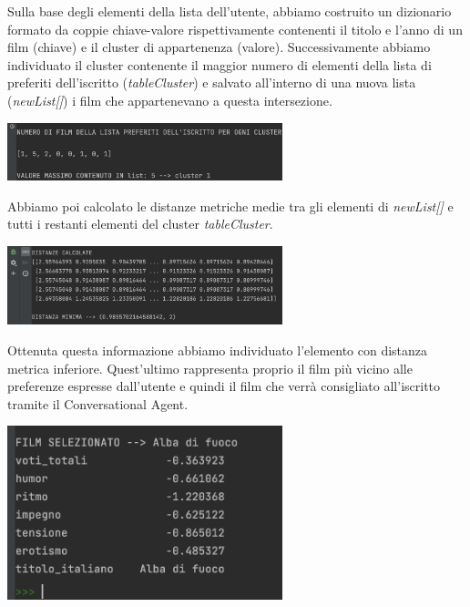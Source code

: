 \documentclass[a4paper, 10pt]{report}
\begin{document}
            Sulla base degli elementi della lista dell'utente, abbiamo costruito un dizionario formato da
            coppie chiave-valore rispettivamente contenenti il titolo e l'anno di un film (chiave) e il cluster di appartenenza (valore).
            Successivamente abbiamo individuato il cluster contenente il maggior numero di elementi della lista di preferiti dell'iscritto (\textit{tableCluster})
            e salvato all'interno di una nuova lista (\textit{newList[]}) i film che appartenevano a questa intersezione.
            \begin{center}
                \includegraphics[width=8cm]{modelling/numeroFilmxCluster}\\
            \end{center}

            Abbiamo poi calcolato le distanze metriche medie tra gli elementi di \textit{newList[]} e tutti i restanti elementi
            del cluster \textit{tableCluster}.
            \begin{center}
                \includegraphics[width=8cm]{modelling/distanzeMetriche}\\
            \end{center}

            Ottenuta questa informazione abbiamo individuato l'elemento con distanza metrica inferiore. Quest'ultimo rappresenta proprio
            il film più vicino alle preferenze espresse dall'utente e quindi il film che verrà consigliato all'iscritto tramite il
            Conversational Agent.
            \begin{center}
                \includegraphics[width=8cm]{modelling/filmSelezionato}\\
            \end{center}
\end{document}
